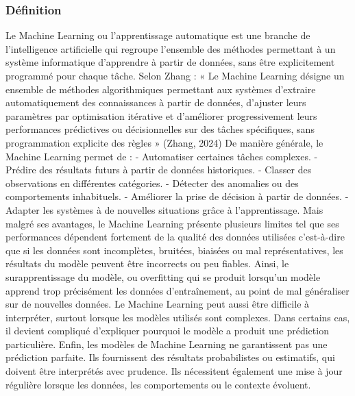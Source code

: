 \subsubsection{Définition}
Le Machine Learning ou l’apprentissage automatique est une branche de l'intelligence artificielle qui regroupe l'ensemble des méthodes permettant à un système informatique d'apprendre à partir de données, sans être explicitement programmé pour chaque tâche. 
Selon Zhang : « Le Machine Learning désigne un ensemble de méthodes algorithmiques permettant aux systèmes d’extraire automatiquement des connaissances à partir de données, d’ajuster leurs paramètres par optimisation itérative et d’améliorer progressivement leurs performances prédictives ou décisionnelles sur des tâches spécifiques, sans programmation explicite des règles » (Zhang, 2024)
De manière générale, le Machine Learning permet de :
-	Automatiser certaines tâches complexes.
-	Prédire des résultats futurs à partir de données historiques.
-	Classer des observations en différentes catégories. 
-	Détecter des anomalies ou des comportements inhabituels. 
-	Améliorer la prise de décision à partir de données. 
-	Adapter les systèmes à de nouvelles situations grâce à l’apprentissage.
Mais malgré ses avantages, le Machine Learning présente plusieurs limites tel que ses performances dépendent fortement de la qualité des données utilisées c’est-à-dire que si les données sont incomplètes, bruitées, biaisées ou mal représentatives, les résultats du modèle peuvent être incorrects ou peu fiables.
Ainsi, le surapprentissage du modèle, ou overfitting qui se produit lorsqu’un modèle apprend trop précisément les données d’entraînement, au point de mal généraliser sur de nouvelles données.
Le Machine Learning peut aussi être difficile à interpréter, surtout lorsque les modèles utilisés sont complexes. Dans certains cas, il devient compliqué d’expliquer pourquoi le modèle a produit une prédiction particulière.
Enfin, les modèles de Machine Learning ne garantissent pas une prédiction parfaite. Ils fournissent des résultats probabilistes ou estimatifs, qui doivent être interprétés avec prudence. Ils nécessitent également une mise à jour régulière lorsque les données, les comportements ou le contexte évoluent.

